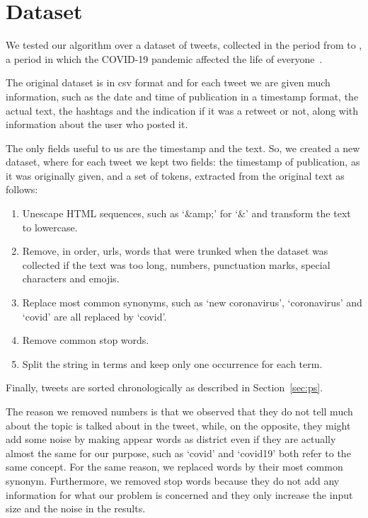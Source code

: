 \section{Dataset} 
We tested our algorithm over a dataset of  tweets, 
collected in the period from  to ,
a period in which the COVID-19 pandemic affected the life of everyone~\cite{dataset:gpreda}.

The original dataset is in csv format and for each tweet we are given much information,
such as the date and time of publication in a timestamp format, the actual text, the hashtags and the indication if it was a 
retweet or not, along with information about the user who posted it.

The only fields useful to us are the timestamp and the text. 
So, we created a new dataset, where for each tweet we kept two fields: the timestamp of publication, as it was originally given, and a set of tokens, extracted from the original text as follows:
\begin{enumerate}
    \item Unescape HTML sequences, such as `\&amp;' for `\&' and transform the text to lowercase.
    \item Remove, in order, urls, words that were trunked when the dataset was collected if the text was too long, numbers, punctuation marks, special characters and emojis.
    \item Replace most common synonyms, such as `new coronavirus', `coronavirus' and `covid' are all replaced by `covid'.
    \item Remove common stop words.
    \item Split the string in terms and keep only one occurrence for each term.
\end{enumerate}
Finally, tweets are sorted chronologically as described in Section~\ref{sec:ps}.

The reason we removed numbers is that we observed that they do not tell much about the topic is talked about in the tweet, while, on the opposite, they might add some noise by making appear words as district even if they are actually almost the same for our purpose, such as `covid' and `covid19' both refer to the same concept. For the same reason, we replaced words by their most common synonym.
Furthermore, we removed stop words because they do not add any information for what our problem is concerned and they only increase the input size and the noise in the results.
